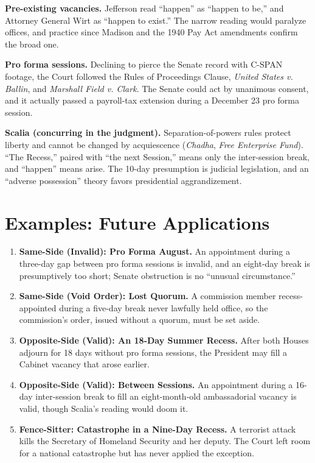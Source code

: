 \documentclass[12pt]{article}
\begin{document}
\textbf{Pre-existing vacancies.} Jefferson read ``happen'' as ``happen to be,'' and Attorney General Wirt as ``happen to exist.'' The narrow reading would paralyze offices, and practice since Madison and the 1940 Pay Act amendments confirm the broad one.

\textbf{Pro forma sessions.} Declining to pierce the Senate record with C-SPAN footage, the Court followed the Rules of Proceedings Clause, \textit{United States v. Ballin}, and \textit{Marshall Field v. Clark}. The Senate could act by unanimous consent, and it actually passed a payroll-tax extension during a December 23 pro forma session.

\textbf{Scalia (concurring in the judgment).} Separation-of-powers rules protect liberty and cannot be changed by acquiescence (\textit{Chadha}, \textit{Free Enterprise Fund}). ``The Recess,'' paired with ``the next Session,'' means only the inter-session break, and ``happen'' means arise. The 10-day presumption is judicial legislation, and an ``adverse possession'' theory favors presidential aggrandizement.

\section{Examples: Future Applications}

\begin{enumerate}
\item \textbf{Same-Side (Invalid): Pro Forma August.} An appointment during a three-day gap between pro forma sessions is invalid, and an eight-day break is presumptively too short; Senate obstruction is no ``unusual circumstance.''
\item \textbf{Same-Side (Void Order): Lost Quorum.} A commission member recess-appointed during a five-day break never lawfully held office, so the commission's order, issued without a quorum, must be set aside.
\item \textbf{Opposite-Side (Valid): An 18-Day Summer Recess.} After both Houses adjourn for 18 days without pro forma sessions, the President may fill a Cabinet vacancy that arose earlier.
\item \textbf{Opposite-Side (Valid): Between Sessions.} An appointment during a 16-day inter-session break to fill an eight-month-old ambassadorial vacancy is valid, though Scalia's reading would doom it.
\item \textbf{Fence-Sitter: Catastrophe in a Nine-Day Recess.} A terrorist attack kills the Secretary of Homeland Security and her deputy. The Court left room for a national catastrophe but has never applied the exception.
\end{enumerate}
\end{document}
